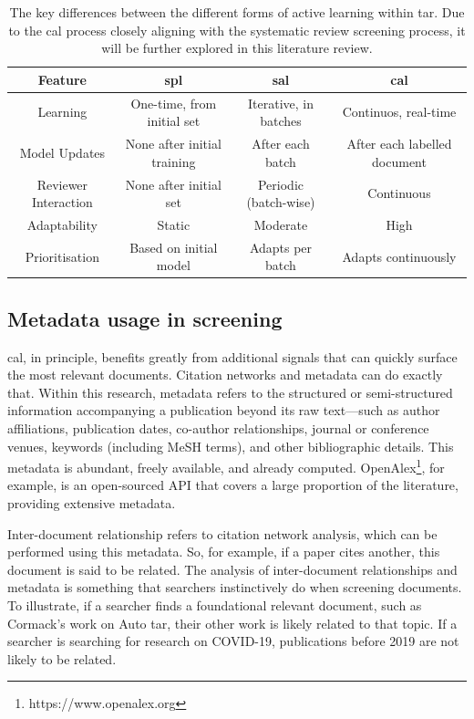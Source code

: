 \documentclass[10pt,oneside]{book}
\begin{document}
\begin{table}[t]

    \centering
    \footnotesize
    \begin{tabular}{|c|c|c|c|}
        \hline
        \textbf{Feature} & \textbf{\gls*{spl}} & \textbf{\gls*{sal}} & \textbf{\gls*{cal}} \\
        \hline
        Learning & One-time, from initial set  & Iterative, in batches  & Continuos, real-time \\
        \hline
        Model Updates & None after initial training & After each batch & After each labelled document \\
        \hline
        Reviewer Interaction & None after initial set & Periodic (batch-wise) & Continuous \\
        \hline
        Adaptability & Static  & Moderate & High \\
        \hline
        Prioritisation & Based on initial model & Adapts per batch & Adapts continuously \\
        \hline
    \end{tabular}
    \caption{The key differences between the different forms of active learning within \gls*{tar}. Due to the \gls*{cal} process closely aligning with the systematic review screening process, it will be further explored in this literature review.}
    \label{tab:differences_in_tar}
\end{table}



\subsection{Metadata usage in screening}

\gls*{cal}, in principle, benefits greatly from additional signals that can quickly surface the most relevant documents. Citation networks and metadata can do exactly that. Within this research, metadata refers to the structured or semi-structured information accompanying a publication beyond its raw text—such as author affiliations, publication dates, co-author relationships, journal or conference venues, keywords (including MeSH terms), and other bibliographic details. This metadata is abundant, freely available, and already computed. OpenAlex\footnote{https://www.openalex.org}, for example, is an open-sourced API that covers a large proportion of the literature, providing extensive metadata.

Inter-document relationship refers to citation network analysis, which can be performed using this metadata. So, for example, if a paper cites another, this document is said to be related. The analysis of inter-document relationships and metadata is something that searchers instinctively do when screening documents. To illustrate, if a searcher finds a foundational relevant document, such as Cormack's work on Auto \gls*{tar}, their other work is likely related to that topic. If a searcher is searching for research on COVID-19, publications before 2019 are not likely to be related. 
\end{document}
